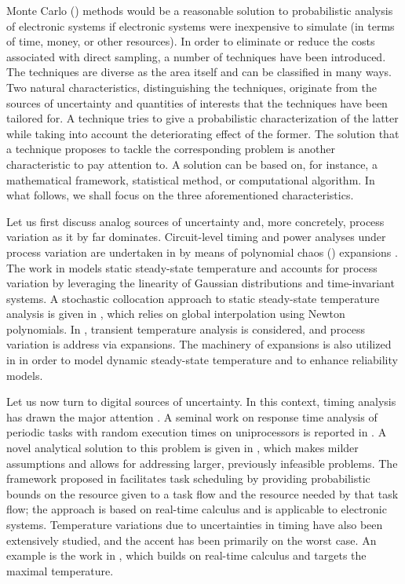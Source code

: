Monte Carlo () methods would be a reasonable solution to probabilistic
analysis of electronic systems if electronic systems were inexpensive to
simulate (in terms of time, money, or other resources). In order to eliminate or
reduce the costs associated with direct sampling, a number of techniques have
been introduced. The techniques are diverse as the area itself and can be
classified in many ways. Two natural characteristics, distinguishing the
techniques, originate from the sources of uncertainty and quantities of
interests that the techniques have been tailored for. A technique tries to give
a probabilistic characterization of the latter while taking into account the
deteriorating effect of the former. The solution that a technique proposes to
tackle the corresponding problem is another characteristic to pay attention to.
A solution can be based on, for instance, a mathematical framework, statistical
method, or computational algorithm. In what follows, we shall focus on the three
aforementioned characteristics.

Let us first discuss analog sources of uncertainty and, more concretely, process
variation as it by far dominates. Circuit-level timing and power analyses under
process variation are undertaken in \cite{bhardwaj2008} by means of polynomial
chaos () expansions \cite{xiu2010}. The work in \cite{juan2012} models
static steady-state temperature and accounts for process variation by leveraging
the linearity of Gaussian distributions and time-invariant systems. A stochastic
collocation \cite{xiu2010} approach to static steady-state temperature analysis
is given in \cite{lee2013}, which relies on global interpolation using Newton
polynomials. In \cite{ukhov2014}, transient temperature analysis is considered,
and process variation is address via  expansions. The machinery of
 expansions is also utilized in \cite{ukhov2015} in order to model
dynamic steady-state temperature \cite{ukhov2012} and to enhance reliability
models.

Let us now turn to digital sources of uncertainty. In this context, timing
analysis has drawn the major attention \cite{quinton2012}. A seminal work on
response time analysis of periodic tasks with random execution times on
uniprocessors is reported in \cite{diaz2002}. A novel analytical solution to
this problem is given in \cite{tanasa2015}, which makes milder assumptions and
allows for addressing larger, previously infeasible problems. The framework
proposed in \cite{santinelli2011} facilitates task scheduling by providing
probabilistic bounds on the resource given to a task flow and the resource
needed by that task flow; the approach is based on real-time calculus and is
applicable to electronic systems. Temperature variations due to uncertainties in
timing have also been extensively studied, and the accent has been primarily on
the worst case. An example is the work in \cite{yang2013}, which builds on
real-time calculus and targets the maximal temperature.

